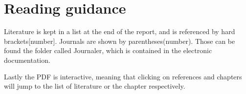 \documentclass[../../main]{subfiles}
\begin{document}
\section{Reading guidance}

Literature is kept in a list at the end of the report, and is referenced by hard brackets[number].
Journals are shown by parentheses(number).
Those can be found the folder called Journaler, which is contained in the electronic documentation.

Lastly the PDF is interactive, meaning that clicking on references and chapters will jump to the list of literature or the chapter respectively.
\end{document}
